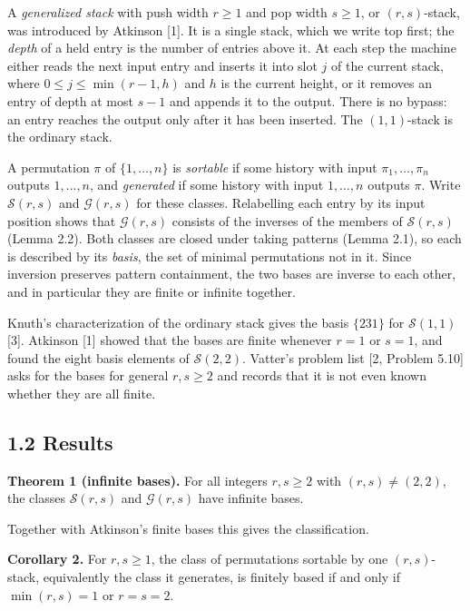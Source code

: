 \documentclass[11pt,letterpaper]{article}
\begin{document}
A \emph{generalized stack} with push width \(r\ge1\) and pop width
\(s\ge1\), or \((r,s)\)-stack, was introduced by Atkinson {[}1{]}. It is
a single stack, which we write top first; the \emph{depth} of a held
entry is the number of entries above it. At each step the machine either
reads the next input entry and inserts it into slot \(j\) of the current
stack, where \(0\le j\le\min(r-1,h)\) and \(h\) is the current height,
or it removes an entry of depth at most \(s-1\) and appends it to the
output. There is no bypass: an entry reaches the output only after it
has been inserted. The \((1,1)\)-stack is the ordinary stack.

A permutation \(\pi\) of \(\{1,\dots,n\}\) is \emph{sortable} if some
history with input \(\pi_1,\dots,\pi_n\) outputs \(1,\dots,n\), and
\emph{generated} if some history with input \(1,\dots,n\) outputs
\(\pi\). Write \(\mathcal S(r,s)\) and \(\mathcal G(r,s)\) for these
classes. Relabelling each entry by its input position shows that
\(\mathcal G(r,s)\) consists of the inverses of the members of
\(\mathcal S(r,s)\) (Lemma 2.2). Both classes are closed under taking
patterns (Lemma 2.1), so each is described by its \emph{basis}, the set
of minimal permutations not in it. Since inversion preserves pattern
containment, the two bases are inverse to each other, and in particular
they are finite or infinite together.

Knuth's characterization of the ordinary stack gives the basis
\(\{231\}\) for \(\mathcal S(1,1)\) {[}3{]}. Atkinson {[}1{]} showed
that the bases are finite whenever \(r=1\) or \(s=1\), and found the
eight basis elements of \(\mathcal S(2,2)\). Vatter's problem list {[}2,
Problem 5.10{]} asks for the bases for general \(r,s\ge2\) and records
that it is not even known whether they are all finite.

\subsection{1.2 Results}\label{results}

\textbf{Theorem 1 (infinite bases).} For all integers \(r,s\ge2\) with
\((r,s)\ne(2,2)\), the classes \(\mathcal S(r,s)\) and
\(\mathcal G(r,s)\) have infinite bases.

Together with Atkinson's finite bases this gives the classification.

\textbf{Corollary 2.} For \(r,s\ge1\), the class of permutations
sortable by one \((r,s)\)-stack, equivalently the class it generates, is
finitely based if and only if \(\min(r,s)=1\) or \(r=s=2\).
\end{document}
